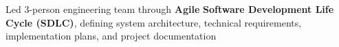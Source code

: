     \listItem{}
        {Led 3-person engineering team through \textbf{Agile} \textbf{Software Development Life Cycle (SDLC)}, defining system architecture, technical requirements, implementation plans, and project documentation}
    \itemListEnd